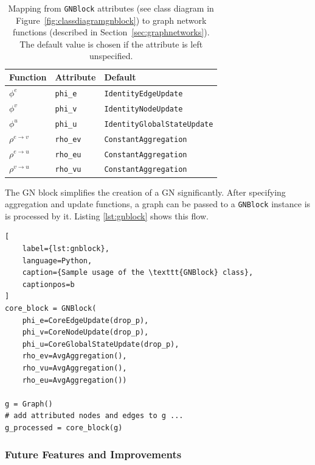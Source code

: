 \begin{table}
    \centering
    \begin{tabular}{ l l l }
        \hline
        \textbf{Function} & \textbf{Attribute} & \textbf{Default}\\
        \hline
        $\phi^e$ & \texttt{phi\_e} & \texttt{IdentityEdgeUpdate} \\
        $\phi^v$ & \texttt{phi\_v} & \texttt{IdentityNodeUpdate} \\
        $\phi^u$ & \texttt{phi\_u} & \texttt{IdentityGlobalStateUpdate} \\
        $\rho^{e\rightarrow v}$ & \texttt{rho\_ev} & \texttt{ConstantAggregation} \\
        $\rho^{e\rightarrow u}$ & \texttt{rho\_eu} & \texttt{ConstantAggregation} \\
        $\rho^{v\rightarrow u}$ & \texttt{rho\_vu} & \texttt{ConstantAggregation} \\
        \hline
    \end{tabular}
    \caption[Mapping from \texttt{GNBlock} attributes to graph network functions]{Mapping from \texttt{GNBlock} attributes (see class diagram in Figure~\ref{fig:classdiagramgnblock}) to graph network functions (described in Section~\ref{sec:graphnetworks}). The default value is chosen if the attribute is left unspecified.}
    \label{tab:gnblockattrs}
\end{table}

The GN block simplifies the creation of a GN significantly. After specifying aggregation and update functions, a graph can be passed to a \texttt{GNBlock} instance is is processed by it. Listing \ref{lst:gnblock} shows this flow.

\begin{lstlisting}[
    label={lst:gnblock},
    language=Python,
    caption={Sample usage of the \texttt{GNBlock} class},
    captionpos=b
]
core_block = GNBlock(
    phi_e=CoreEdgeUpdate(drop_p),
    phi_v=CoreNodeUpdate(drop_p),
    phi_u=CoreGlobalStateUpdate(drop_p),
    rho_ev=AvgAggregation(),
    rho_vu=AvgAggregation(),
    rho_eu=AvgAggregation())

g = Graph()
# add attributed nodes and edges to g ...
g_processed = core_block(g)
\end{lstlisting}

\subsubsection{Future Features and Improvements}
\label{sec:gnlibfuturefeatures}

